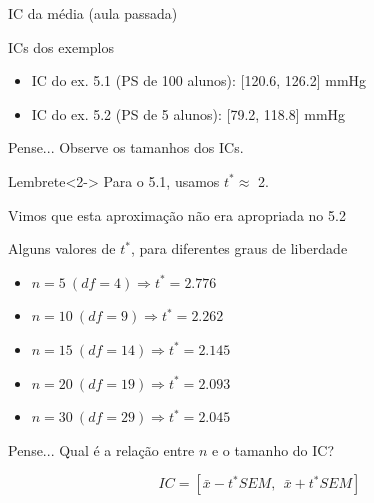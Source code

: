 \documentclass{beamer}
\begin{document}
\begin{frame}{\scriptsize IC da média (aula passada)}
  \begin{exampleblock}{ICs dos exemplos}
    \footnotesize
    \begin{itemize}
      \footnotesize
    \item IC do ex. 5.1 (PS de 100 alunos): [120.6, 126.2] mmHg
    \item IC do ex. 5.2 (PS de   5 alunos): [79.2, 118.8] mmHg
    \end{itemize}
  \end{exampleblock}
  \begin{block}{Pense...}
    Observe os tamanhos dos ICs.
  \end{block}
  \begin{block}{Lembrete}<2->
    Para o 5.1, usamos $t^{*} \approx$ 2.

    \bigskip
    Vimos que esta aproximação \alert{não era apropriada} no 5.2
  \end{block}

\end{frame}

\begin{frame}{\scriptsize Alguns valores de $t^{*}$, para diferentes graus de liberdade}
  \begin{itemize}
    \footnotesize
  \item $n = 5\ (df = 4) \Rightarrow t^{*} = 2.776$
  \item $n = 10\ (df = 9) \Rightarrow t^{*} = 2.262$
  \item $n = 15\ (df = 14) \Rightarrow t^{*} = 2.145$
  \item $n = 20\ (df = 19) \Rightarrow t^{*} = 2.093$
  \item $n = 30\ (df = 29) \Rightarrow t^{*} = 2.045$
  \end{itemize}
  \begin{block}{Pense...}
    \footnotesize
    Qual é a relação entre $n$ e o tamanho do IC?

    \begin{displaymath}
      IC = \left[ \bar{x} - t^{*} SEM,\ \ \bar{x} + t^{*} SEM \right]
    \end{displaymath}
  \end{block}
\end{frame}
\end{document}
